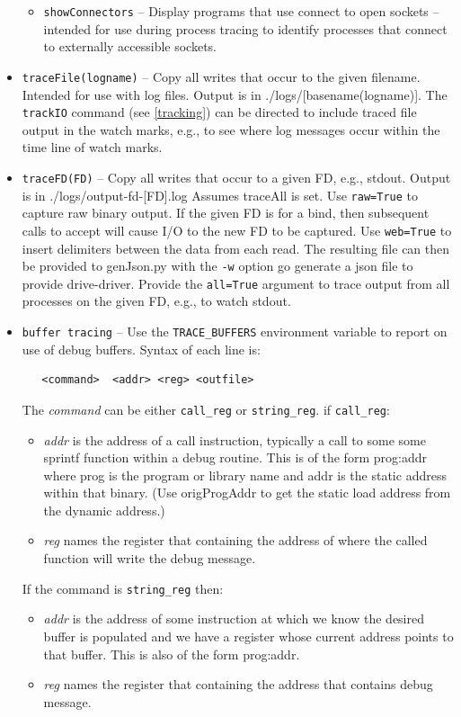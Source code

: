 \documentclass[titlepage]{article}
\begin{document}
\begin{itemize}
\begin{itemize}
\item {\tt showConnectors} – Display programs that use connect to open sockets – intended for use during process tracing to identify processes that connect to externally accessible sockets.
\end{itemize}

\item {\tt traceFile(logname)} – Copy all writes that occur to the given filename.  Intended for use with log files.  Output is in ./logs/[basename(logname)].
The {\tt trackIO} command (see \ref{tracking}) can be directed to include traced file output in the watch marks, e.g., to see where log messages occur within the
time line of watch marks.

\item {\tt traceFD(FD)} – Copy all writes that occur to a given FD, e.g., stdout.  Output is in ./logs/output-fd-[FD].log   Assumes traceAll is set.  Use {\tt raw=True} to capture 
raw binary output.  If the given FD is for a bind, then subsequent calls to accept will cause I/O to the new FD to be captured.
Use {\tt web=True} to insert delimiters between the data from each read.  The resulting file can then be provided to genJson.py with the {\tt -w} option go generate a json file to provide drive-driver.  Provide the {\tt all=True} argument to trace output from all processes on the given FD, e.g., to watch stdout.

\item {\tt buffer tracing} – Use the {\tt TRACE\_BUFFERS} environment variable to report on use of debug buffers.  Syntax of each line is:
\label{buffer-tracing}
\begin{verbatim}
   <command>  <addr> <reg> <outfile>
\end{verbatim}
The \textit{command} can be either {\tt call\_reg} or {\tt string\_reg}. if {\tt call\_reg}:
\begin{itemize}
\item \textit{addr} is the address of a call instruction, typically a call to some some sprintf function within a debug routine. This is of the form prog:addr where prog is the
program or library name and addr is the static address within that binary. (Use origProgAddr to get the static load address from the dynamic address.)
\item \textit{reg} names the register that containing the address of where the called function will write the debug message.
\end{itemize}
If the command is {\tt string\_reg} then:
\begin{itemize}
\item \textit{addr} is the address of some instruction at which we know the desired buffer is populated and we have a register whose current address points to that
buffer.  This is also of the form prog:addr.
\item \textit{reg} names the register that containing the address that contains debug message.
\end{itemize}


\end{itemize}
\end{document}
